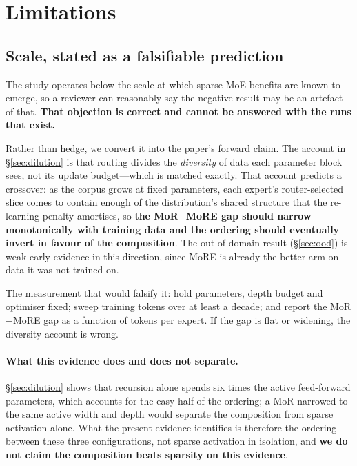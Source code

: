 \section*{Limitations}
\label{sec:limitations}
\label{page:limitations_start}

\subsection*{Scale, stated as a falsifiable prediction}

The study operates below the scale at which sparse-MoE benefits are known to
emerge, so a reviewer can reasonably say the negative result may be an artefact of
that. \textbf{That objection is correct and cannot be answered with the runs that
exist.}

Rather than hedge, we convert it into the paper's forward claim. The account in
\S\ref{sec:dilution} is that routing divides the \emph{diversity} of data each
parameter block sees, not its update budget---which is matched exactly. That
account predicts a crossover: as the corpus grows at fixed parameters, each
expert's router-selected slice comes to contain enough of the distribution's shared
structure that the re-learning penalty amortises, so
\textbf{the MoR$-$MoRE gap should narrow monotonically with training data and the
ordering should eventually invert in favour of the composition}. The out-of-domain
result (\S\ref{sec:ood}) is weak early evidence in this direction, since MoRE is
already the better arm on data it was not trained on.

The measurement that would falsify it: hold parameters, depth budget and optimiser
fixed; sweep training tokens over at least a decade; and report the MoR$-$MoRE gap
as a function of tokens per expert. If the gap is flat or widening, the diversity
account is wrong.

\paragraph{What this evidence does and does not separate.}
\S\ref{sec:dilution} shows that recursion alone spends six times the active
feed-forward parameters, which accounts for the easy half of the ordering; a MoR
narrowed to the same active width and depth would separate the composition from
sparse activation alone. What the present evidence identifies is therefore the
ordering between these three configurations, not sparse activation in isolation,
and \textbf{we do not claim the composition beats sparsity on this evidence}.

